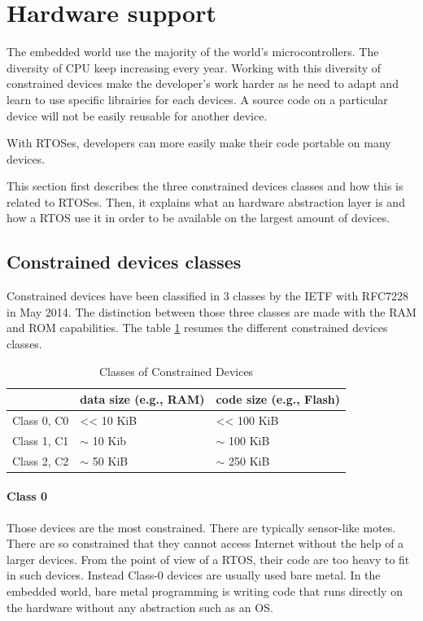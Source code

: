 \section{Hardware support}

The embedded world use the majority of the world's microcontrollers.
The diversity of CPU keep increasing every year.
Working with this diversity of constrained devices make the developer's work harder as he need to adapt and learn to use specific librairies for each devices.
A source code on a particular device will not be easily reusable for another device.

With RTOSes, developers can more easily make their code portable on many devices.

This section first describes the three constrained devices classes and how this is related to RTOSes.
Then, it explains what an hardware abstraction layer is and how a RTOS use it in order to be available on the largest amount of devices.

\subsection{Constrained devices classes}

Constrained devices have been classified in 3 classes by the IETF with RFC7228 in May 2014. The distinction between those three classes are made with the RAM and ROM capabilities.
The table \ref{tab:constrained-devices-classes} resumes the different constrained devices classes.

\begin{table}[!h]
  \centering
  \begin{tabular}{|l|l|l|}
  \hline
   & data size (e.g., RAM) & code size (e.g., Flash) \\ \hline
  Class 0, C0 & \textless{}\textless{} 10 KiB & \textless{}\textless{} 100 KiB \\ %
  Class 1, C1 & $\sim$ 10 Kib & $\sim$ 100 KiB \\ %
  Class 2, C2 & $\sim$ 50 KiB & $\sim$ 250 KiB \\ \hline
  \end{tabular}
  \caption{Classes of Constrained Devices}
  \label{tab:constrained-devices-classes}
\end{table}

\paragraph{Class 0}
Those devices are the most constrained.
There are typically sensor-like motes.
There are so constrained that they cannot access Internet without the help of a larger devices.
From the point of view of a RTOS, their code are too heavy to fit in such devices.
Instead Class-0 devices are usually used bare metal.
In the embedded world, bare metal programming is writing code that runs directly on the hardware without any abstraction such as an OS.

